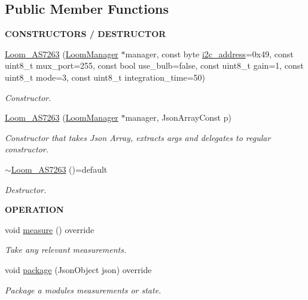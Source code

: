 \subsection*{Public Member Functions}
\begin{Indent}{\bf C\+O\+N\+S\+T\+R\+U\+C\+T\+O\+RS / D\+E\+S\+T\+R\+U\+C\+T\+OR}\par
\begin{DoxyCompactItemize}
\item 
\hyperlink{class_loom___a_s7263_a3a15f9e5368a3cf4104a5bcaa04f9b92}{Loom\+\_\+\+A\+S7263} (\hyperlink{class_loom_manager}{Loom\+Manager} $\ast$manager, const byte \hyperlink{class_loom_i2_c_sensor_a6ff389c1f015152a9ebfccb037d3d90e}{i2c\+\_\+address}=0x49, const uint8\+\_\+t mux\+\_\+port=255, const bool use\+\_\+bulb=false, const uint8\+\_\+t gain=1, const uint8\+\_\+t mode=3, const uint8\+\_\+t integration\+\_\+time=50)
\begin{DoxyCompactList}\small\item\em Constructor. \end{DoxyCompactList}\item 
\hyperlink{class_loom___a_s7263_a59c8df9792caa300cd83dbdbed801abd}{Loom\+\_\+\+A\+S7263} (\hyperlink{class_loom_manager}{Loom\+Manager} $\ast$manager, Json\+Array\+Const p)
\begin{DoxyCompactList}\small\item\em Constructor that takes Json Array, extracts args and delegates to regular constructor. \end{DoxyCompactList}\item 
\hyperlink{class_loom___a_s7263_a18eb13aef95e127eddb673076fc6d680}{$\sim$\+Loom\+\_\+\+A\+S7263} ()=default
\begin{DoxyCompactList}\small\item\em Destructor. \end{DoxyCompactList}\end{DoxyCompactItemize}
\end{Indent}
\begin{Indent}{\bf O\+P\+E\+R\+A\+T\+I\+ON}\par
\begin{DoxyCompactItemize}
\item 
void \hyperlink{class_loom___a_s7263_a5bb1bbea6714b129033436b058b7ae49}{measure} () override
\begin{DoxyCompactList}\small\item\em Take any relevant measurements. \end{DoxyCompactList}\item 
void \hyperlink{class_loom___a_s7263_ad2003ca203febd1dc34dc19184187631}{package} (Json\+Object json) override
\begin{DoxyCompactList}\small\item\em Package a modules measurements or state. \end{DoxyCompactList}\end{DoxyCompactItemize}
\end{Indent}
